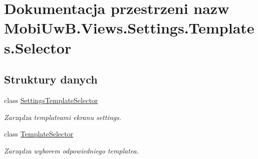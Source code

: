 \hypertarget{a00286}{}\section{Dokumentacja przestrzeni nazw Mobi\+Uw\+B.\+Views.\+Settings.\+Templates.\+Selector}
\label{a00286}
\subsection*{Struktury danych}
\begin{DoxyCompactItemize}
\item 
class \hyperlink{a00057}{Settings\+Template\+Selector}
\begin{DoxyCompactList}\small\item\em Zarządza template\textquotesingle{}ami ekranu settings. \end{DoxyCompactList}\item 
class \hyperlink{a00071}{Template\+Selector}
\begin{DoxyCompactList}\small\item\em Zarządza wyborem odpowiedniego template\textquotesingle{}a. \end{DoxyCompactList}\end{DoxyCompactItemize}
